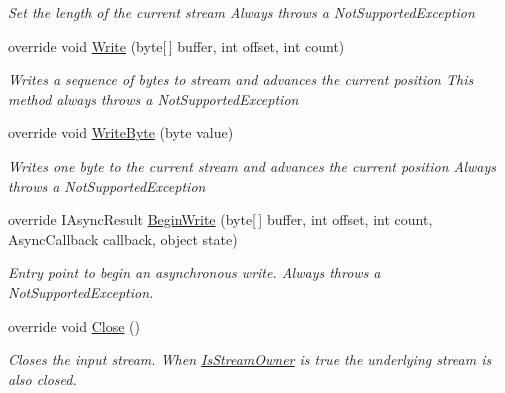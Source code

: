 \begin{DoxyCompactItemize}
\begin{DoxyCompactList}\small\item\em Set the length of the current stream Always throws a Not\+Supported\+Exception \end{DoxyCompactList}\item 
override void \hyperlink{class_i_c_sharp_code_1_1_sharp_zip_lib_1_1_l_z_w_1_1_lzw_input_stream_a0b0440335df7f32d0c7de5d8ddc7dc3a}{Write} (byte\mbox{[}$\,$\mbox{]} buffer, int offset, int count)
\begin{DoxyCompactList}\small\item\em Writes a sequence of bytes to stream and advances the current position This method always throws a Not\+Supported\+Exception \end{DoxyCompactList}\item 
override void \hyperlink{class_i_c_sharp_code_1_1_sharp_zip_lib_1_1_l_z_w_1_1_lzw_input_stream_ab76621e330908f1ec3eb3077381b32a7}{Write\+Byte} (byte value)
\begin{DoxyCompactList}\small\item\em Writes one byte to the current stream and advances the current position Always throws a Not\+Supported\+Exception \end{DoxyCompactList}\item 
override I\+Async\+Result \hyperlink{class_i_c_sharp_code_1_1_sharp_zip_lib_1_1_l_z_w_1_1_lzw_input_stream_a5facdd338f00c41aaca0b618b1d1c2b3}{Begin\+Write} (byte\mbox{[}$\,$\mbox{]} buffer, int offset, int count, Async\+Callback callback, object state)
\begin{DoxyCompactList}\small\item\em Entry point to begin an asynchronous write. Always throws a Not\+Supported\+Exception. \end{DoxyCompactList}\item 
override void \hyperlink{class_i_c_sharp_code_1_1_sharp_zip_lib_1_1_l_z_w_1_1_lzw_input_stream_a275b4db0e5320b4d40242a97faef3669}{Close} ()
\begin{DoxyCompactList}\small\item\em Closes the input stream. When \hyperlink{class_i_c_sharp_code_1_1_sharp_zip_lib_1_1_l_z_w_1_1_lzw_input_stream_a8aa029f06f66ef308ff556f75422adcc}{Is\+Stream\+Owner} is true the underlying stream is also closed. \end{DoxyCompactList}\end{DoxyCompactItemize}

